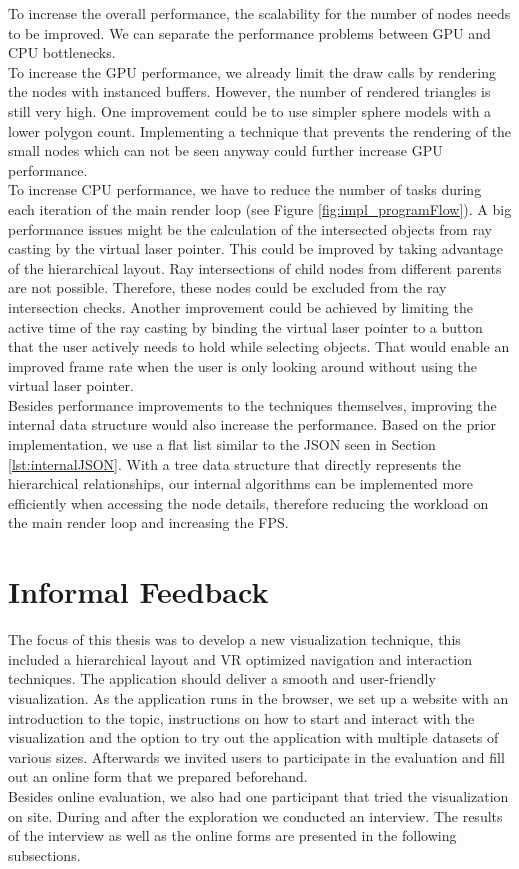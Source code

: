 To increase the overall performance, the scalability for the number of nodes needs to be improved. We can separate the performance problems between GPU and CPU bottlenecks.
\\
To increase the GPU performance, we already limit the draw calls by rendering the nodes with instanced buffers.
However, the number of rendered triangles is still very high. 
One improvement could be to use simpler sphere models with a lower polygon count. Implementing a technique that prevents the rendering of the small nodes which can not be seen anyway could further increase GPU performance.
\\
To increase CPU performance, we have to reduce the number of tasks during each iteration of the main render loop (see Figure \ref{fig:impl_programFlow}).
A big performance issues might be the calculation of the intersected objects from ray casting by the virtual laser pointer. This could be improved by taking advantage of the hierarchical layout.
Ray intersections of child nodes from different parents are not possible. Therefore, these nodes could be excluded from the ray intersection checks. 
Another improvement could be achieved by limiting the active time of the ray casting by binding the virtual laser pointer to a button that the user actively needs to hold while selecting objects. 
That would enable an improved frame rate when the user is only looking around without using the virtual laser pointer.
\\
Besides performance improvements to the techniques themselves, improving the internal data structure would also increase the performance. Based on the prior implementation, we use a flat list similar to the JSON seen in Section \ref{lst:internalJSON}. With a tree data structure that directly represents the hierarchical relationships, our internal algorithms can be implemented more efficiently when accessing the node details, therefore reducing the workload on the main render loop and increasing the FPS.

\section{Informal Feedback}
\label{sec:informalFeedback}

The focus of this thesis was to develop a new visualization technique, this included a hierarchical layout and VR optimized navigation and interaction techniques.
The application should deliver a smooth and user-friendly visualization.
As the application runs in the browser, we set up a website \cite{thesisWebsite} with an introduction to the topic, instructions on how to start and interact with the visualization and the option to try out the application with multiple datasets of various sizes. Afterwards we invited users to participate in the evaluation and fill out an online form that we prepared beforehand.
\\
Besides online evaluation, we also had one participant that tried the visualization on site. During and after the exploration we conducted an interview.
The results of the interview as well as the online forms are presented in the following subsections.

